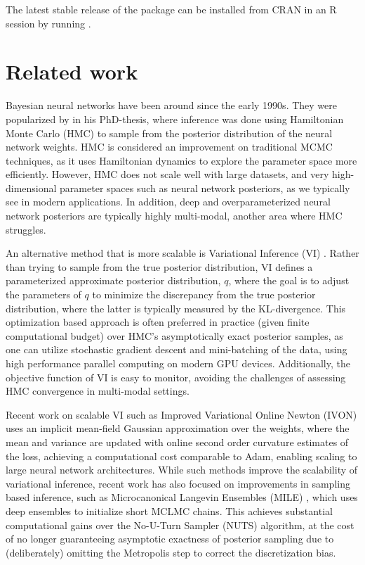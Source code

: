The latest stable release of the package can be installed from CRAN in an R session by running .

\section{Related work}
Bayesian neural networks have been around since the early 1990s. They were popularized by \cite{neal1995bayesian} in his PhD-thesis, where inference was done using Hamiltonian Monte Carlo (HMC) \citep{duane1987hybrid} to sample from the posterior distribution of the neural network weights. HMC is considered an improvement on traditional MCMC techniques, as it uses Hamiltonian dynamics to explore the parameter space more efficiently. However, HMC does not scale well with large datasets, and very high-dimensional parameter spaces such as neural network posteriors, as we typically see in modern applications. In addition, deep and overparameterized neural network posteriors are typically highly multi-modal, another area where HMC struggles.  

An alternative method that is more scalable is Variational Inference (VI) \citep{jordan1999introduction}. Rather than trying to sample from the true posterior distribution, VI defines a parameterized approximate posterior distribution, $q$, where the goal is to adjust the parameters of $q$ to minimize the discrepancy from the true posterior distribution, where the latter is typically measured by the KL-divergence. This optimization based approach is often preferred in practice (given finite computational budget) over HMC's asymptotically exact posterior samples, as one can utilize stochastic gradient descent and mini-batching of the data, using high performance parallel computing on modern GPU devices. Additionally, the objective function of VI is easy to monitor, avoiding the challenges of assessing HMC convergence in multi-modal settings. 

Recent work on scalable VI such as Improved Variational Online Newton (IVON) \citep{shen2024variational} uses an implicit mean-field Gaussian approximation over the weights, where the mean and variance are updated with online second order curvature estimates of the loss, achieving a computational cost comparable to Adam, enabling scaling to large neural network architectures. While such methods improve the scalability of variational inference, recent work has also focused on improvements in sampling based inference, such as Microcanonical Langevin Ensembles (MILE) \citep{sommer2025microcanonicallangevinensemblesadvancing}, which uses deep ensembles to initialize short MCLMC \citep{robnik2023fluctuation} chains. This achieves substantial computational gains over the No-U-Turn Sampler (NUTS) \citep{hoffman2014no} algorithm, at the cost of no longer guaranteeing asymptotic exactness of posterior sampling due to (deliberately) omitting the Metropolis step to correct the discretization bias.

